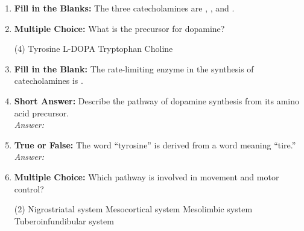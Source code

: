 \begin{enumerate}[label=\textbf{Q3.5.\arabic*}]
    \item \textbf{Fill in the Blanks:} The three catecholamines are \underline{\hspace{3cm}}, \underline{\hspace{3cm}}, and \underline{\hspace{3cm}}.

    \item \textbf{Multiple Choice:} What is the precursor for dopamine?
        \begin{tasks}[label=\textcolor{\documentTheme}{(\Alph*)}, item-format=\color{\documentTheme}, label-width=1.5em, item-indent=1.7em](4)
            \task Tyrosine
            \task L-DOPA
            \task Tryptophan
            \task Choline
        \end{tasks}

    \item \textbf{Fill in the Blank:} The rate-limiting enzyme in the synthesis of catecholamines is \underline{\hspace{3cm}}.

    \item \textbf{Short Answer:} Describe the pathway of dopamine synthesis from its amino acid precursor. \\
        \textit{Answer:} %

    \item \textbf{True or False:} The word ``tyrosine'' is derived from a word meaning ``tire.'' \\
        \textit{Answer:} %

    \item \textbf{Multiple Choice:} Which pathway is involved in movement and motor control?
        \begin{tasks}[label=\textcolor{\documentTheme}{(\Alph*)}, item-format=\color{\documentTheme}, label-width=1.5em, item-indent=1.7em](2)
            \task Nigrostriatal system
            \task Mesocortical system
            \task Mesolimbic system
            \task Tuberoinfundibular system
        \end{tasks}


\end{enumerate}
